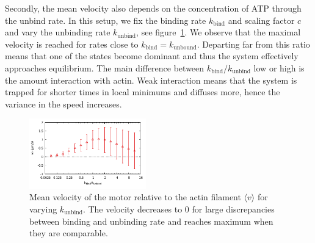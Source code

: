 \documentclass[aps,pre,twocolumn,showpacs,showkeys]{revtex4-1}
\begin{document}
Secondly, the mean velocity also depends on the concentration of ATP through the unbind rate. 
In this setup, we fix the binding rate $k_\text{bind}$ and scaling factor $c$ and vary the unbinding rate $k_\text{unbind}$, see figure~\ref{Fig: v_k}. 
We observe that the maximal velocity is reached for rates close to $k_\text{bind} = k_\text{unbound}$. 
Departing far from this ratio means that one of the states become dominant and thus the system effectively approaches equilibrium.  
The main difference between $k_\text{bind}/k_\text{unbind}$ low or high is the amount interaction with actin. 
Weak interaction means that the system is trapped for shorter times in local minimums and diffuses more, hence the variance in the speed increases. 
\begin{figure}[t]
\centering
\includegraphics[width=0.45\textwidth,height=!]{v_k}
\caption{Mean velocity of the motor relative to the actin filament $\langle v \rangle$ for varying $k_\text{unbind}$.
The velocity decreases to $0$ for large discrepancies between binding and unbinding rate and reaches maximum when they are comparable.
}
\label{Fig: v_k} 
\end{figure}
\end{document}
